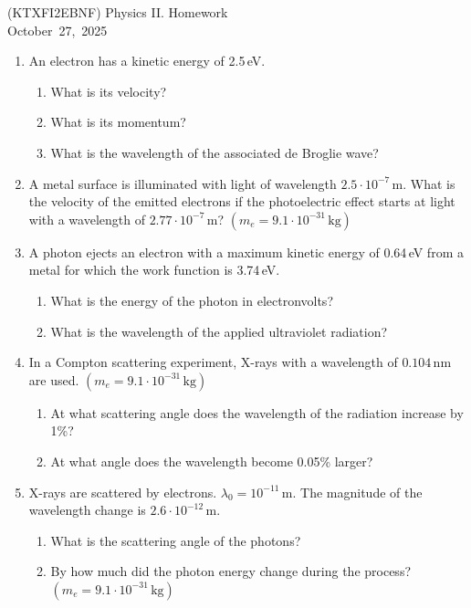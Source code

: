 \documentclass[a4paper,12pt]{letter}
\begin{document}
\begin{center}
 (KTXFI2EBNF) Physics II.  Homework\\ \smallskip
October~27,~2025
 \end{center}


\begin{enumerate}
    \item An electron has a kinetic energy of 2.5\,eV.
    \begin{enumerate}
        \item What is its velocity?
        \item What is its momentum?
        \item What is the wavelength of the associated de Broglie wave?
    \end{enumerate}

    \item A metal surface is illuminated with light of wavelength $2.5 \cdot 10^{-7}\,\text{m}$.  
    What is the velocity of the emitted electrons if the photoelectric effect starts at light with a wavelength of $2.77 \cdot 10^{-7}\,\text{m}$?  
    $(m_e = 9.1 \cdot 10^{-31}\,\text{kg})$

    \item A photon ejects an electron with a maximum kinetic energy of 0.64\,eV from a metal for which the work function is 3.74\,eV.
    \begin{enumerate}
        \item What is the energy of the photon in electronvolts?
        \item What is the wavelength of the applied ultraviolet radiation?
    \end{enumerate}

    \item In a Compton scattering experiment, X-rays with a wavelength of $0.104\,\text{nm}$ are used. $(m_{e} = 9.1 \cdot 10^{-31}\,\text{kg})$
    \begin{enumerate}
        \item At what scattering angle does the wavelength of the radiation increase by 1\%?
        \item At what angle does the wavelength become 0.05\% larger?
    \end{enumerate}

    \item X-rays are scattered by electrons. $\lambda_0 = 10^{-11}\,\text{m}$. The magnitude of the wavelength change is $2.6 \cdot 10^{-12}\,\text{m}$.
    \begin{enumerate}
        \item What is the scattering angle of the photons?
        \item By how much did the photon energy change during the process? $(m_e = 9.1 \cdot 10^{-31}\,\text{kg})$
    \end{enumerate}

\end{enumerate}

\bigskip


\vfill
\end{document}
